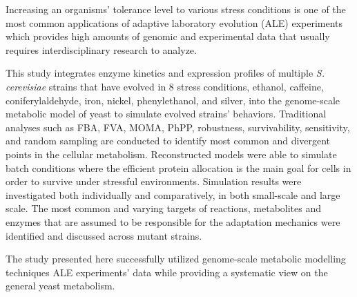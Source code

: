 Increasing an organisms' tolerance level to various stress conditions is one of the most common applications of adaptive laboratory evolution (ALE) experiments which provides high amounts of genomic and experimental data that usually requires interdisciplinary research to analyze.

This study integrates enzyme kinetics and expression profiles of multiple \emph{S. cerevisiae} strains that have evolved in 8 stress conditions, ethanol, caffeine, coniferylaldehyde, iron, nickel, phenylethanol, and silver, into the genome-scale metabolic model of yeast to simulate evolved strains' behaviors. Traditional analyses such as FBA, FVA, MOMA, PhPP, robustness, survivability, sensitivity, and random sampling are conducted to identify most common and divergent points in the cellular metabolism. Reconstructed models were able to simulate batch conditions where the efficient protein allocation is the main goal for cells in order to survive under stressful environments. Simulation results were investigated both individually and comparatively, in both small-scale and large scale. The most common and varying targets of reactions, metabolites and enzymes that are assumed to be responsible for the adaptation mechanics were identified and discussed across mutant strains.

The study presented here successfully utilized genome-scale metabolic modelling techniques ALE experiments' data while providing a systematic view on the general yeast metabolism.
